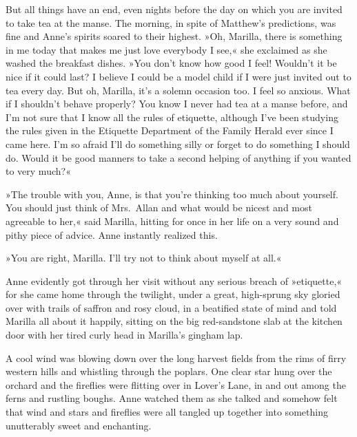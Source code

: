 But all things have an end, even nights before the day on which you are invited to take tea at the manse. The morning, in spite of Matthew's predictions, was fine and Anne's spirits soared to their highest. »Oh, Marilla, there is something in me today that makes me just love everybody I see,« she exclaimed as she washed the breakfast dishes. »You don't know how good I feel! Wouldn't it be nice if it could last? I believe I could be a model child if I were just invited out to tea every day. But oh, Marilla, it's a solemn occasion too. I feel so anxious. What if I shouldn't behave properly? You know I never had tea at a manse before, and I'm not sure that I know all the rules of etiquette, although I've been studying the rules given in the Etiquette Department of the Family Herald ever since I came here. I'm so afraid I'll do something silly or forget to do something I should do. Would it be good manners to take a second helping of anything if you wanted to very much?«

»The trouble with you, Anne, is that you're thinking too much about yourself. You should just think of Mrs.~Allan and what would be nicest and most agreeable to her,« said Marilla, hitting for once in her life on a very sound and pithy piece of advice. Anne instantly realized this.

»You are right, Marilla. I'll try not to think about myself at all.«

Anne evidently got through her visit without any serious breach of »etiquette,« for she came home through the twilight, under a great, high-sprung sky gloried over with trails of saffron and rosy cloud, in a beatified state of mind and told Marilla all about it happily, sitting on the big red-sandstone slab at the kitchen door with her tired curly head in Marilla's gingham lap.

A cool wind was blowing down over the long harvest fields from the rims of firry western hills and whistling through the poplars. One clear star hung over the orchard and the fireflies were flitting over in Lover's Lane, in and out among the ferns and rustling boughs. Anne watched them as she talked and somehow felt that wind and stars and fireflies were all tangled up together into something unutterably sweet and enchanting.


